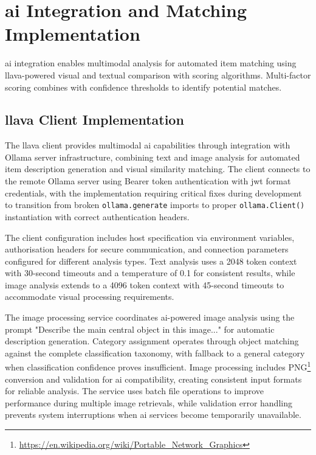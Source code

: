 
\section{\ac{ai} Integration and Matching Implementation} \label{section:ai_integration}

\ac{ai} integration enables multimodal analysis for automated item matching using \ac{llava}-powered visual and textual comparison with scoring algorithms. Multi-factor scoring combines with confidence thresholds to identify potential matches.

\subsection{\ac{llava} Client Implementation} \label{subsection:llava_client}

The \ac{llava} client provides multimodal \ac{ai} capabilities through integration with Ollama server infrastructure, combining text and image analysis for automated item description generation and visual similarity matching. The client connects to the remote Ollama server using Bearer token authentication with \ac{jwt} format credentials, with the implementation requiring critical fixes during development to transition from broken \texttt{ollama.generate} imports to proper \texttt{ollama.Client()} instantiation with correct authentication headers.


The client configuration includes host specification via environment variables, authorisation headers for secure communication, and connection parameters configured for different analysis types. Text analysis uses a 2048 token context with 30-second timeouts and a temperature of 0.1 for consistent results, while image analysis extends to a 4096 token context with 45-second timeouts to accommodate visual processing requirements.

The image processing service coordinates \ac{ai}-powered image analysis using the prompt "Describe the main central object in this image..." for automatic description generation. Category assignment operates through object matching against the complete classification taxonomy, with fallback to a general category when classification confidence proves insufficient. Image processing includes PNG\footnote{\url{https://en.wikipedia.org/wiki/Portable_Network_Graphics}} conversion and validation for \ac{ai} compatibility, creating consistent input formats for reliable analysis. The service uses batch file operations to improve performance during multiple image retrievals, while validation error handling prevents system interruptions when \ac{ai} services become temporarily unavailable.

